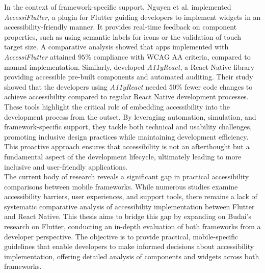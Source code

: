In the context of framework-specific support, Nguyen et al.\cite{nguyen2022flutter} implemented \textit{AccessiFlutter}, a plugin for Flutter guiding developers to implement widgets in an accessibility-friendly manner. It provides real-time feedback on component properties, such as using semantic labels for icons or the validation of touch target size. A comparative analysis showed that apps implemented with \textit{AccessiFlutter} attained $95$\% compliance with WCAG AA criteria, compared to manual implementation. Similarly, \cite{singh2023react} developed \textit{A11yReact}, a React Native library providing accessible pre-built components and automated auditing. Their study showed that the developers using \textit{A11yReact} needed $50$\% fewer code changes to achieve accessibility compared to regular React Native development processes.\\

These tools highlight the critical role of embedding accessibility into the development process from the outset. By leveraging automation, simulation, and framework-specific support, they tackle both technical and usability challenges, promoting inclusive design practices while maintaining development efficiency. This proactive approach ensures that accessibility is not an afterthought but a fundamental aspect of the development lifecycle, ultimately leading to more inclusive and user-friendly applications. \\

The current body of research reveals a significant gap in practical accessibility comparisons between mobile frameworks. While numerous studies examine accessibility barriers, user experiences, and support tools, there remains a lack of systematic comparative analysis of accessibility implementation between Flutter and React Native. This thesis aims to bridge this gap by expanding on Budai's research on Flutter, conducting an in-depth evaluation of both frameworks from a developer perspective. The objective is to provide practical, mobile-specific guidelines that enable developers to make informed decisions about accessibility implementation, offering detailed analysis of components and widgets across both frameworks.

\newpage